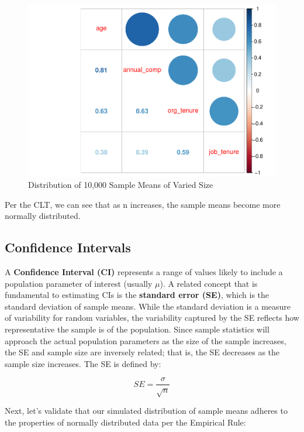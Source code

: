 \documentclass[]{book}
\begin{document}
\begin{figure}

{\centering \includegraphics{_main_files/figure-latex/unnamed-chunk-32-1} 

}

\caption{Distribution of 10,000 Sample Means of Varied Size}\label{fig:unnamed-chunk-32}
\end{figure}

Per the CLT, we can see that as n increases, the sample means become more normally distributed.

\hypertarget{confidence-intervals}{%
\subsection{Confidence Intervals}\label{confidence-intervals}}

A \textbf{Confidence Interval (CI)} represents a range of values likely to include a population parameter of interest (usually \(\mu\)). A related concept that is fundamental to estimating CIs is the \textbf{standard error (SE)}, which is the standard deviation of sample means. While the standard deviation is a measure of variability for random variables, the variability captured by the SE reflects how representative the sample is of the population. Since sample statistics will approach the actual population parameters as the size of the sample increases, the SE and sample size are inversely related; that is, the SE decreases as the sample size increases. The SE is defined by:

\[ SE = \frac{\sigma}{\sqrt{n}} \]

Next, let's validate that our simulated distribution of sample means adheres to the properties of normally distributed data per the Empirical Rule:
\end{document}
